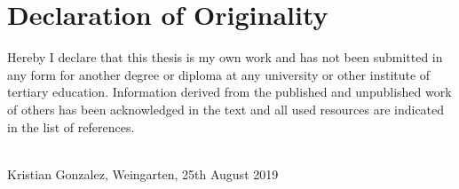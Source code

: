 %
%

\vspace*{1.5cm}

\section*{Declaration of Originality}
Hereby I declare that this thesis is my own work and has not been submitted in any form for another degree or diploma at any university or other institute of tertiary education. Information derived from the published and unpublished work of others has been acknowledged in the text and all used resources are indicated in the list of references.

\vspace{1cm}

\underline{\hspace{5cm}}\\

Kristian Gonzalez, Weingarten, 25th August 2019
